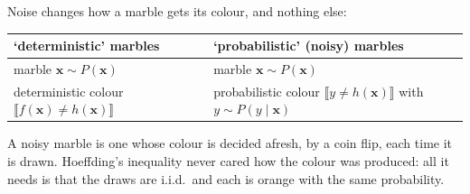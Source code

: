 \begin{center}
\end{center}

Noise changes how a marble gets its colour, and nothing else:

\begin{center}
    \solidrules
    \begin{tabular}{@{}l|l@{}}
        \toprule
        `deterministic' marbles & `probabilistic' (noisy) marbles\\
        \midrule
        marble \(\bm{x} \sim P(\bm{x})\) & marble \(\bm{x} \sim P(\bm{x})\)\\
        deterministic colour \(\llbracket f(\bm{x}) \neq h(\bm{x})
        \rrbracket\)
        & probabilistic colour \(\llbracket y \neq h(\bm{x}) \rrbracket\)
        with \(y \sim P(y \mid \bm{x})\)\\
        \bottomrule
    \end{tabular}
\end{center}

A noisy marble is one whose colour is decided afresh, by a coin flip, each time
it is drawn. Hoeffding's inequality never cared how the colour was produced:
all it needs is that the draws are i.i.d.\ and each is orange with the same
probability.


